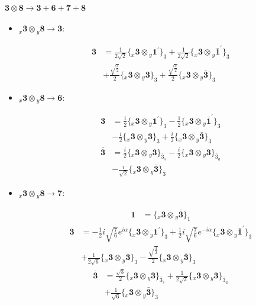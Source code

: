 \documentclass[english]{article}
\newcommand{\cgEqFontsize}{\large}
\newcommand{\rep}[1]{\mathbf{#1}}
\newcommand{\repx}[2]{{}_{#2}\mathbf{#1}}
\newcommand{\tsprod}[2]{\rep{#1}\otimes\rep{#2}}
\newcommand{\tsprodx}[2]{\repx{#1}{x}\otimes\repx{#2}{y}}
\newcommand{\subcgt}[3]{\big\{ \tsprodx{#1}{#2}\big\}^{}_{#3}}
\begin{document}
\paragraph*{\cgEqFontsize $\tsprod{3}{8}\to\rep{3}+\rep{6}+\rep{7}+\rep{8}$}
\begin{itemize}
\item $\tsprodx{3}{8}\to\rep{3}$:
\begin{fleqn}
\begin{align*}
\rep{3} & = \frac{1}{2 \sqrt{2}}\subcgt{3}{1^{\prime}}{3}+\frac{1}{2 \sqrt{2}}\subcgt{3}{\bar{1}^{\prime}}{3} \\ 
 & +\frac{\sqrt{\frac{3}{2}}}{2}\subcgt{3}{3}{3}+\frac{\sqrt{\frac{3}{2}}}{2}\subcgt{3}{\bar{3}}{3}
\end{align*}
\end{fleqn}
\item $\tsprodx{3}{8}\to\rep{6}$:
\begin{fleqn}
\begin{align*}
\rep{3} & = \frac{1}{2}\subcgt{3}{1^{\prime}}{3}-\frac{1}{2}\subcgt{3}{\bar{1}^{\prime}}{3} \\ 
 & -\frac{i}{2}\subcgt{3}{3}{3}+\frac{i}{2}\subcgt{3}{\bar{3}}{3}
\end{align*}
\begin{align*}
\rep{\bar{3}} & = \frac{i}{2}\subcgt{3}{3}{\bar{3}_{s}}-\frac{i}{2}\subcgt{3}{3}{\bar{3}_{a}} \\ 
 & -\frac{i}{\sqrt{2}}\subcgt{3}{\bar{3}}{\bar{3}}
\end{align*}
\end{fleqn}
\item $\tsprodx{3}{8}\to\rep{7}$:
\begin{fleqn}
\begin{align*}
\rep{1} & = \subcgt{3}{\bar{3}}{1}
\end{align*}
\begin{align*}
\rep{3} & = -\frac{1}{2} i \sqrt{\frac{7}{6}} e^{i \alpha }\subcgt{3}{1^{\prime}}{3}+\frac{1}{2} i \sqrt{\frac{7}{6}} e^{-i \alpha }\subcgt{3}{\bar{1}^{\prime}}{3} \\ 
 & +\frac{1}{2 \sqrt{6}}\subcgt{3}{3}{3}-\frac{\sqrt{\frac{3}{2}}}{2}\subcgt{3}{\bar{3}}{3}
\end{align*}
\begin{align*}
\rep{\bar{3}} & = \frac{\sqrt{3}}{2}\subcgt{3}{3}{\bar{3}_{s}}+\frac{1}{2 \sqrt{3}}\subcgt{3}{3}{\bar{3}_{a}} \\ 
 & +\frac{1}{\sqrt{6}}\subcgt{3}{\bar{3}}{\bar{3}}
\end{align*}

\end{fleqn}
\end{itemize}
\end{document}
